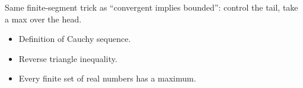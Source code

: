 \begin{remark*}
Same finite-segment trick as ``convergent implies bounded'': control the
tail, take a max over the head.
\end{remark*}

\begin{remark*}[Dependencies]
\begin{itemize}
  \item Definition of Cauchy sequence.
  \item Reverse triangle inequality.
  \item Every finite set of real numbers has a maximum.
\end{itemize}
\end{remark*}
